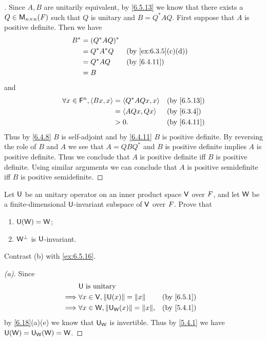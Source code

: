 \begin{proof}[]
  Since \(A, B\) are unitarily equivalent, by \cref{6.5.13} we know that there exists a \(Q \in \ms[n][n][\F]\) such that \(Q\) is unitary and \(B = Q^* A Q\).
  First suppose that \(A\) is positive definite.
  Then we have
  \begin{align*}
    B^* & = (Q^* A Q)^*                         \\
        & = Q^* A^* Q   &  & \by{ex:6.3.5}[c,d] \\
        & = Q^* A Q     &  & \by{6.4.11}        \\
        & = B
  \end{align*}
  and
  \begin{align*}
    \forall x \in \vs{F}^n, \inn{Bx, x} & = \inn{Q^* A Q x, x} &  & \by{6.5.13} \\
                                        & = \inn{AQx, Qx}      &  & \by{6.3.4}  \\
                                        & > 0.                 &  & \by{6.4.11}
  \end{align*}
  Thus by \cref{6.4.8} \(B\) is self-adjoint and by \cref{6.4.11} \(B\) is positive definite.
  By reversing the role of \(B\) and \(A\) we see that \(A = Q B Q^*\) and \(B\) is positive definite implies \(A\) is positive definite.
  Thus we conclude that \(A\) is positive definite iff \(B\) is positive definite.
  Using similar arguments we can conclude that \(A\) is positive semidefinite iff \(B\) is positive semidefinite.
\end{proof}

\begin{ex}\label{ex:6.5.15}
  Let \(\mathsf{U}\) be an unitary operator on an inner product space \(\mathsf{V}\) over \(\mathit{F}\), and let \(\mathsf{W}\) be a finite-dimensional \(\mathsf{U}\)-invariant subspace of \(\mathsf{V}\) over \(\mathit{F}\).
  Prove that
  \begin{enumerate}
    \item \(\mathsf{U}(\mathsf{W}) = \mathsf{W}\);
    \item \(\mathsf{W}^{\perp}\) is \(\mathsf{U}\)-invariant.
  \end{enumerate}
  Contrast (b) with \cref{ex:6.5.16}.
\end{ex}

\begin{proof}[(a)]
  Since
  \begin{align*}
             & \U \text{ is unitary}                                           \\
    \implies & \forall x \in \V, \norm{\U(x)} = \norm{x}       &  & \by{6.5.1} \\
    \implies & \forall x \in \W, \norm{\U_{\W}(x)} = \norm{x}, &  & \by{5.4.1}
  \end{align*}
  by \cref{6.18}(a)(e) we know that \(\mathsf{U}_{\mathsf{W}}\) is invertible.
  Thus by \cref{5.4.1} we have \(\mathsf{U}(\mathsf{W}) = \mathsf{U}_{\mathsf{W}}(\mathsf{W}) = \mathsf{W}\).
\end{proof}

